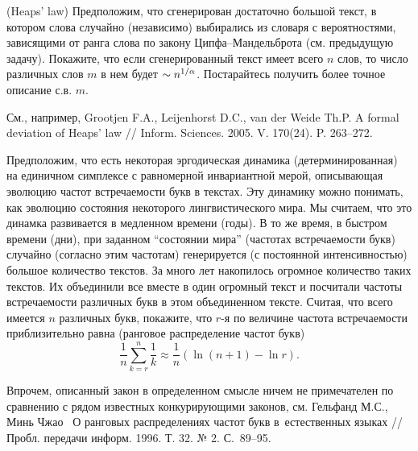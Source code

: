 \begin{problem}\Star(Heaps' law) 
Предположим, что сгенерирован достаточно 
большой текст, в котором слова случайно (независимо) выбирались из словаря с 
вероятностями, зависящими от ранга слова по закону Ципфа--Мандельброта (см. 
предыдущую задачу). Покажите, что если сгенерированный текст имеет всего $n$ 
слов, то число различных слов $m$ в нем будет $\sim n^{1 \mathord{\left/ 
{\vphantom {1 \alpha }} \right. \kern-\nulldelimiterspace} \alpha }$. 
Постарайтесь получить более точное описание с.в. $m$.
\end{problem}

\begin{remark}
 См., например, Grootjen F.A., Leijenhorst D.C., van der Weide Th.P. A formal deviation of Heaps' law // 
Inform. Sciences. 2005. V. 170(24). P. 263--272.
\end{remark}

\begin{problem} 
Предположим, что есть некоторая эргодическая динамика 
(детерминированная) на единичном симплексе с равномерной инвариантной мерой, 
описывающая эволюцию частот встречаемости букв в текстах. Эту динамику можно 
понимать, как эволюцию состояния некоторого лингвистического мира. Мы 
считаем, что это динамка развивается в медленном времени (годы). В то же 
время, в быстром времени (дни), при заданном ``состоянии мира'' (частотах 
встречаемости букв) случайно (согласно этим частотам) генерируется (с 
постоянной интенсивностью) большое количество текстов. За много лет 
накопилось огромное количество таких текстов. Их объединили все вместе в 
один огромный текст и посчитали частоты встречаемости различных букв в этом 
объединенном тексте. Считая, что всего имеется $n$ различных букв, покажите, 
что $r$-я по величине частота встречаемости приблизительно равна (ранговое 
распределение частот букв)
\[
\frac{1}{n}\sum\limits_{k=r}^n {\frac{1}{k}} \approx \frac{1}{n}\left( {\ln 
\left( {n+1} \right)-\ln r} \right).
\]
\end{problem}

\begin{remark}
 Впрочем, описанный 
закон в определенном смысле ничем не примечателен по сравнению с рядом 
известных конкурирующими законов, см. Гельфанд М.С., Минь Чжао~ О ранговых распределениях частот 
букв в~естественных языках // Пробл. передачи информ. 1996. Т. 32. № 2. 
С.~89--95.~
\end{remark}

